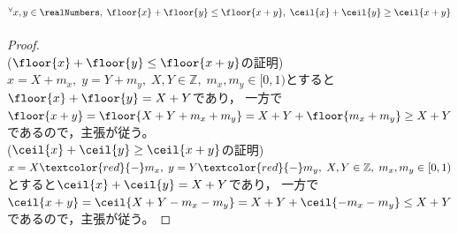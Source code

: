         \subsection{\texorpdfstring{$^\forall x,y\in\realNumbers,\;\floor{x}+\floor{y}\leq\floor{x+y},\;\ceil{x}+\ceil{y}\geq\ceil{x+y}$}{∀x,y∈R, floor(x)+floor(y) ≦ floor(x+y), ceil(x)+ceil(y) ≧ ceil(x+y)}}
            \begin{proof}
                \quad\\
                ($\floor{x}+\floor{y}\leq\floor{x+y}$の証明)\\
                $x=X+m_x,\;y=Y+m_y,\;X,Y\in\mathbb{Z},\;m_x,m_y\in[0,1)$とすると$\floor{x}+\floor{y} = X+Y$であり，
                一方で$\floor{x+y} = \floor{X+Y+m_x+m_y} = X+Y + \floor{m_x+m_y} \geq X+Y$であるので，主張が従う。\\
                \newline
                ($\ceil{x}+\ceil{y}\geq\ceil{x+y}$の証明)\\
                $x=X\textcolor{red}{-}m_x,\;y=Y\textcolor{red}{-}m_y,\;X,Y\in\mathbb{Z},\;m_x,m_y\in[0,1)$とすると$\ceil{x}+\ceil{y} = X+Y$であり，
                一方で$\ceil{x+y} = \ceil{X+Y-m_x-m_y} = X+Y + \ceil{-m_x-m_y} \leq X+Y$であるので，主張が従う。
            \end{proof}